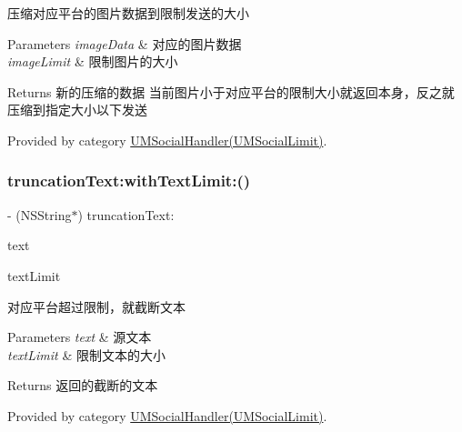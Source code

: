 压缩对应平台的图片数据到限制发送的大小


\begin{DoxyParams}{Parameters}
{\em image\+Data} & 对应的图片数据 \\
\hline
{\em image\+Limit} & 限制图片的大小\\
\hline
\end{DoxyParams}
\begin{DoxyReturn}{Returns}
新的压缩的数据  当前图片小于对应平台的限制大小就返回本身，反之就压缩到指定大小以下发送 
\end{DoxyReturn}


Provided by category \mbox{\hyperlink{category_u_m_social_handler_07_u_m_social_limit_08_a240f1107abc2ef1e2d139535551a4f36}{U\+M\+Social\+Handler(\+U\+M\+Social\+Limit)}}.

\mbox{\label{interface_u_m_social_handler_ae19a28003b6af6039dc68c0b465386c0}} 
\subsubsection{\texorpdfstring{truncation\+Text\+:with\+Text\+Limit\+:()}{truncationText:withTextLimit:()}\hspace{0.1cm}{\footnotesize\ttfamily [1/2]}}
{\footnotesize\ttfamily -\/ (N\+S\+String$\ast$) truncation\+Text\+: \begin{DoxyParamCaption}\item[{(N\+S\+String $\ast$)}]{text }\item[{withTextLimit:(N\+S\+U\+Integer)}]{text\+Limit }\end{DoxyParamCaption}}

对应平台超过限制，就截断文本


\begin{DoxyParams}{Parameters}
{\em text} & 源文本 \\
\hline
{\em text\+Limit} & 限制文本的大小\\
\hline
\end{DoxyParams}
\begin{DoxyReturn}{Returns}
返回的截断的文本 
\end{DoxyReturn}


Provided by category \mbox{\hyperlink{category_u_m_social_handler_07_u_m_social_limit_08_ae19a28003b6af6039dc68c0b465386c0}{U\+M\+Social\+Handler(\+U\+M\+Social\+Limit)}}.

